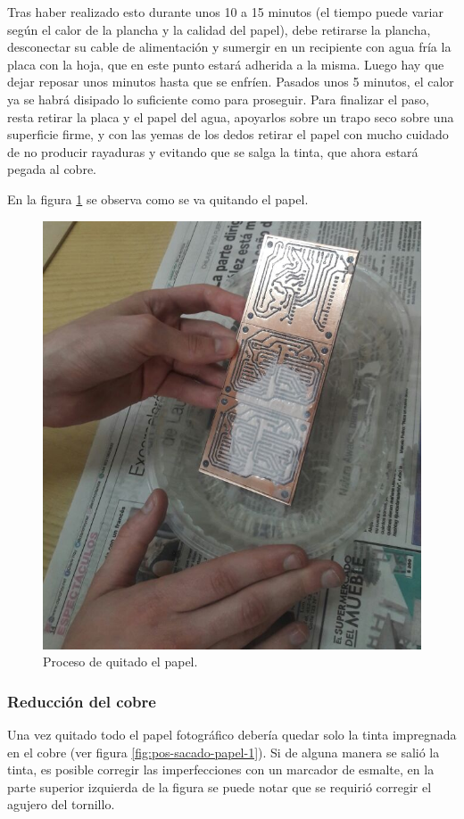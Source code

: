 Tras haber realizado esto durante unos 10 a 15 minutos (el tiempo puede variar según el calor de la plancha y la calidad del papel), debe retirarse la plancha, desconectar su cable de alimentación y sumergir en un recipiente con agua fría la placa con la hoja, que en este punto estará adherida a la misma. 
Luego hay que dejar reposar unos minutos hasta que se enfríen. Pasados unos 5 minutos, el calor ya se habrá disipado lo suficiente como para proseguir. Para finalizar el paso, resta retirar la placa y el papel del agua, apoyarlos sobre un trapo seco sobre una superficie firme, y con las yemas de los dedos retirar el papel con mucho cuidado de no producir rayaduras y evitando que se salga la tinta, que ahora estará pegada al cobre.

En la figura \ref{fig:sacado-papel} se observa como se va quitando el papel.

\begin{figure}[ht!]
	\centering
	\includegraphics[width=0.6\linewidth]{imagenes/pcbeando/sacado-papel-1.png}
	\caption{Proceso de quitado el papel.}
	\label{fig:sacado-papel}
\end{figure}

\subsubsection{Reducción del cobre}
Una vez quitado todo el papel fotográfico debería quedar solo la tinta impregnada en el cobre (ver figura \ref{fig:pos-sacado-papel-1}). Si de alguna manera se salió la tinta, es posible corregir las imperfecciones con un marcador de esmalte, en la parte superior izquierda de la figura se puede notar que se requirió corregir el agujero del tornillo.

